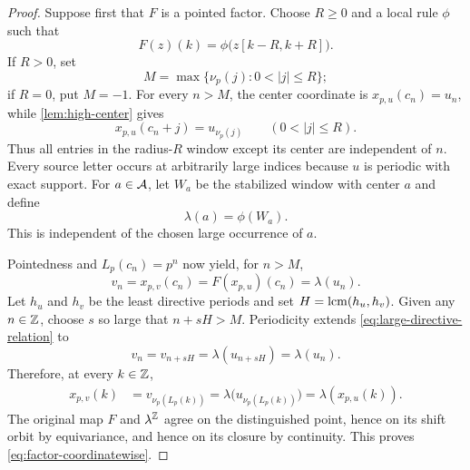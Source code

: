 \begin{proof}
  Suppose first that $F$ is a pointed factor.  Choose $R\geq0$ and a local
  rule $\phi$ such that
  \begin{equation}
    F(z)(k)=\phi\bigl(z[k-R,k+R]\bigr).
    \label{eq:chl-rule}
  \end{equation}
  If $R>0$, set
  \begin{equation}
    M=\max\{\nu_p(j):0<|j|\leq R\};
    \label{eq:window-threshold}
  \end{equation}
  if $R=0$, put $M=-1$.  For every $n>M$, the center coordinate is
  $x_{p,u}(c_n)=u_n$, while \cref{lem:high-center} gives
  \begin{equation}
    x_{p,u}(c_n+j)=u_{\nu_p(j)}
    \qquad(0<|j|\leq R).
    \label{eq:high-window-normal-form}
  \end{equation}
  Thus all entries in the radius-$R$ window except its center are
  independent of $n$.  Every source letter occurs at arbitrarily large
  indices because $u$ is periodic with exact support.  For $a\in\mathcal A$,
  let $W_a$ be the stabilized window with center $a$ and define
  \begin{equation}
    \lambda(a)=\phi(W_a).
    \label{eq:lambda-definition}
  \end{equation}
  This is independent of the chosen large occurrence of $a$.

  Pointedness and $L_p(c_n)=p^n$ now yield, for $n>M$,
  \begin{equation}
    v_n=x_{p,v}(c_n)=F(x_{p,u})(c_n)=\lambda(u_n).
    \label{eq:large-directive-relation}
  \end{equation}
  Let $h_u$ and $h_v$ be the least directive periods and set
  $H=\operatorname{lcm}(h_u,h_v)$.  Given any $n\in\mathbb Z$, choose $s$ so large that
  $n+sH>M$.  Periodicity extends \cref{eq:large-directive-relation} to
  \begin{equation}
    v_n=v_{n+sH}=\lambda(u_{n+sH})=\lambda(u_n).
    \label{eq:all-directive-relation}
  \end{equation}
  Therefore, at every $k\in\mathbb Z$,
  \begin{align}
    x_{p,v}(k)
      &=v_{\nu_p(L_p(k))}
        =\lambda\bigl(u_{\nu_p(L_p(k))}\bigr)
        =\lambda(x_{p,u}(k)).
    \label{eq:basepoint-coordinate-map}
  \end{align}
  The original map $F$ and $\lambda^{\mathbb Z}$ agree on the distinguished
  point, hence on its shift orbit by equivariance, and hence on its closure
  by continuity.  This proves \cref{eq:factor-coordinatewise}.


\end{proof}
